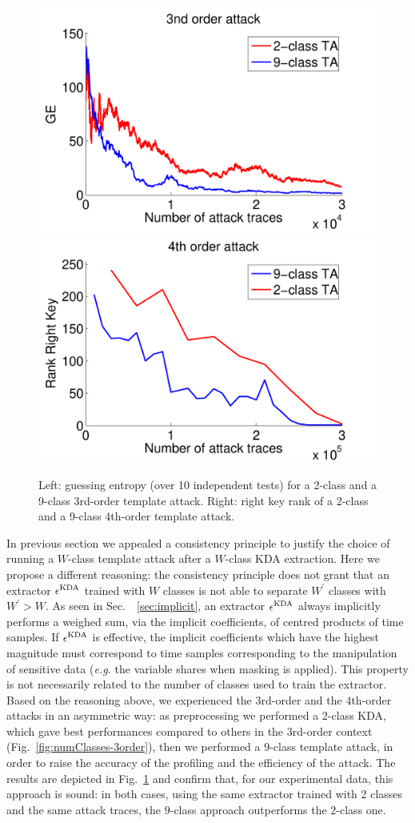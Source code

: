 \begin{figure}
\includegraphics[width=.5\textwidth]{../Figures/CARDIS2016/3order_2_9.pdf} 
\includegraphics[width=.5\textwidth]{../Figures/CARDIS2016/4order_2_9.pdf} 
\caption[KDA preprocessing performance for  $3$rd-order and $4$th-order template attack]{Left: guessing entropy (over 10 independent tests) for a 2-class and a 9-class $3$rd-order template attack. Right: right key rank of a 2-class and a 9-class $4$th-order template attack.}\label{fig:3-4}
\end{figure}
In previous section we appealed a consistency principle to justify the choice of running a $W$-class template attack after a $W$-class KDA extraction. Here we propose a different reasoning: the consistency principle does not grant that an extractor $\epsilon^{\mathrm{KDA}}$ trained with $W$ classes is not able to separate $W^\prime$ classes with $W^\prime > W$. As seen in Sec.~~\ref{sec:implicit}, an extractor $\epsilon^{\mathrm{KDA}}$ always implicitly performs a weighed sum, via the implicit coefficients, of centred products of time samples. If $\epsilon^{\mathrm{KDA}}$ is effective, the implicit coefficients which have the highest magnitude must correspond to time samples corresponding to the manipulation of sensitive data (\emph{e.g.} the variable shares when masking is applied). This property is not necessarily related to the number of classes used to train the extractor.\\

Based on the reasoning above, we experienced the $3$rd-order and the $4$th-order attacks in an asymmetric way: as preprocessing we performed a $2$-class KDA, which gave best performances compared to others in the 3rd-order context (Fig.~\ref{fig:numClasses-3order}), then we performed  a $9$-class template attack, in order to raise the accuracy of the profiling and the efficiency of the attack.  The results are depicted in Fig.~\ref{fig:3-4} and confirm that, for our experimental data, this approach is sound: in both cases, using the same extractor trained with 2 classes and the same attack traces, the $9$-class approach outperforms the $2$-class one.
 
